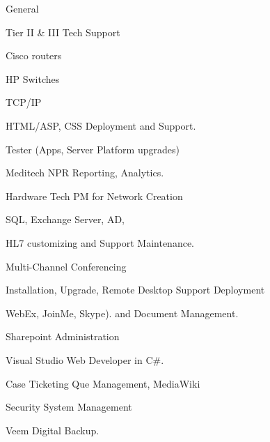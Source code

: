 \begin{cventries}
  \cventry
    {General}
    {
      \begin{cvitems}
        \item  Tier II \& III Tech Support 
        \item Cisco routers
        \item HP Switches
        \item TCP/IP
        \item HTML/ASP, CSS Deployment and Support.
        \item Tester (Apps, Server Platform upgrades) 
        \item Meditech NPR Reporting, Analytics.
        \item Hardware Tech PM for Network Creation 
        \item SQL, Exchange Server, AD, 
        \item HL7 customizing and Support Maintenance.
        \item Multi-Channel Conferencing
        \item Installation, Upgrade, Remote Desktop Support Deployment
        \item WebEx, JoinMe, Skype). and Document Management.
        \item Sharepoint Administration
        \item Visual Studio Web Developer in C\#.
        \item Case Ticketing Que Management, MediaWiki
        \item Security System Management
        \item Veem Digital Backup.
      \end{cvitems}
    }
\end{cventries}
